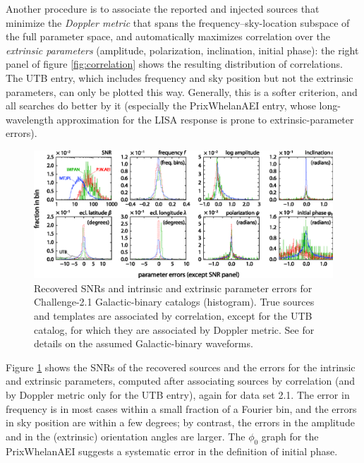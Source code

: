 \documentclass{iopart}
\begin{document}
Another procedure is to associate the reported and injected sources that minimize the \emph{Doppler metric} that spans the frequency--sky-location subspace of the full parameter space, and automatically maximizes correlation over the \emph{extrinsic parameters} (amplitude, polarization, inclination, initial phase): the right panel of figure \ref{fig:correlation} shows the resulting distribution of correlations. The UTB entry, which includes frequency and sky position but not the extrinsic parameters, can only be plotted this way. Generally, this is a softer criterion, and all searches do better by it (especially the PrixWhelanAEI entry, whose long-wavelength approximation for the LISA response is prone to extrinsic-parameter errors).
%
\begin{figure}
\includegraphics[width=\textwidth]{Errors-b-2}
\vspace{-18pt}
\caption{Recovered SNRs and intrinsic and extrinsic parameter errors for Challenge-2.1 Galactic-binary catalogs (histogram). True sources and templates are associated by correlation, except for the UTB catalog, for which they are associated by Doppler metric. See \cite{mldcgwdaw2} for details on the assumed Galactic-binary waveforms.\label{fig:paramerrors}}
\vspace{-6pt}
\end{figure}

Figure \ref{fig:paramerrors} shows the SNRs of the recovered sources and the errors for the intrinsic and extrinsic parameters, computed after associating sources by correlation (and by Doppler metric only for the UTB entry), again for data set 2.1. The error in frequency is in most cases within a small fraction of a Fourier bin, and the errors in sky position are within a few degrees; by contrast, the errors in the amplitude and in the (extrinsic) orientation angles are larger. The $\phi_0$ graph for the PrixWhelanAEI suggests a systematic error in the definition of initial phase.
\end{document}
